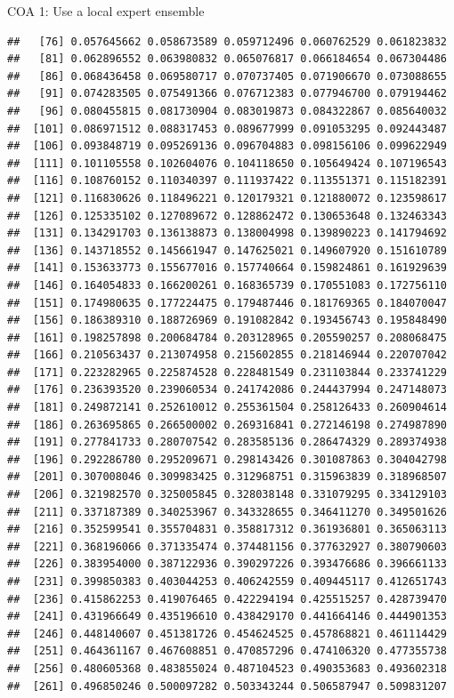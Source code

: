 \documentclass[ignorenonframetext,]{beamer}
\begin{document}
\begin{frame}[fragile]{COA 1: Use a local expert ensemble}
\begin{verbatim}
##   [76] 0.057645662 0.058673589 0.059712496 0.060762529 0.061823832
##   [81] 0.062896552 0.063980832 0.065076817 0.066184654 0.067304486
##   [86] 0.068436458 0.069580717 0.070737405 0.071906670 0.073088655
##   [91] 0.074283505 0.075491366 0.076712383 0.077946700 0.079194462
##   [96] 0.080455815 0.081730904 0.083019873 0.084322867 0.085640032
##  [101] 0.086971512 0.088317453 0.089677999 0.091053295 0.092443487
##  [106] 0.093848719 0.095269136 0.096704883 0.098156106 0.099622949
##  [111] 0.101105558 0.102604076 0.104118650 0.105649424 0.107196543
##  [116] 0.108760152 0.110340397 0.111937422 0.113551371 0.115182391
##  [121] 0.116830626 0.118496221 0.120179321 0.121880072 0.123598617
##  [126] 0.125335102 0.127089672 0.128862472 0.130653648 0.132463343
##  [131] 0.134291703 0.136138873 0.138004998 0.139890223 0.141794692
##  [136] 0.143718552 0.145661947 0.147625021 0.149607920 0.151610789
##  [141] 0.153633773 0.155677016 0.157740664 0.159824861 0.161929639
##  [146] 0.164054833 0.166200261 0.168365739 0.170551083 0.172756110
##  [151] 0.174980635 0.177224475 0.179487446 0.181769365 0.184070047
##  [156] 0.186389310 0.188726969 0.191082842 0.193456743 0.195848490
##  [161] 0.198257898 0.200684784 0.203128965 0.205590257 0.208068475
##  [166] 0.210563437 0.213074958 0.215602855 0.218146944 0.220707042
##  [171] 0.223282965 0.225874528 0.228481549 0.231103844 0.233741229
##  [176] 0.236393520 0.239060534 0.241742086 0.244437994 0.247148073
##  [181] 0.249872141 0.252610012 0.255361504 0.258126433 0.260904614
##  [186] 0.263695865 0.266500002 0.269316841 0.272146198 0.274987890
##  [191] 0.277841733 0.280707542 0.283585136 0.286474329 0.289374938
##  [196] 0.292286780 0.295209671 0.298143426 0.301087863 0.304042798
##  [201] 0.307008046 0.309983425 0.312968751 0.315963839 0.318968507
##  [206] 0.321982570 0.325005845 0.328038148 0.331079295 0.334129103
##  [211] 0.337187389 0.340253967 0.343328655 0.346411270 0.349501626
##  [216] 0.352599541 0.355704831 0.358817312 0.361936801 0.365063113
##  [221] 0.368196066 0.371335474 0.374481156 0.377632927 0.380790603
##  [226] 0.383954000 0.387122936 0.390297226 0.393476686 0.396661133
##  [231] 0.399850383 0.403044253 0.406242559 0.409445117 0.412651743
##  [236] 0.415862253 0.419076465 0.422294194 0.425515257 0.428739470
##  [241] 0.431966649 0.435196610 0.438429170 0.441664146 0.444901353
##  [246] 0.448140607 0.451381726 0.454624525 0.457868821 0.461114429
##  [251] 0.464361167 0.467608851 0.470857296 0.474106320 0.477355738
##  [256] 0.480605368 0.483855024 0.487104523 0.490353683 0.493602318
##  [261] 0.496850246 0.500097282 0.503343244 0.506587947 0.509831207

\end{verbatim}
\end{frame}
\end{document}
